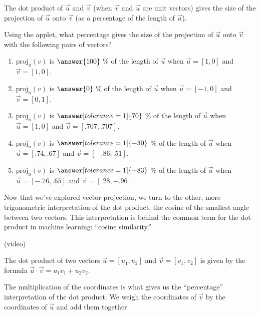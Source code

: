 \documentclass{ximera}
\begin{document}
\begin{problem}
The dot product of $\vec{u}$ and $\vec{v}$ (when $\vec{v}$  and $\vec{u}$ are unit vectors) gives the size of the projection of $\vec{u}$ onto $\vec{v}$ (as a percentage of the length of $\vec{u}$).

Using the applet, what percentage gives the size of the projection of $\vec{u}$ onto $\vec{v}$ with the following pairs of vectors?

\begin{enumerate}
\item $\text{proj}_u(v)$ is $\answer{100}$ $\%$ of the length of $\vec{u}$ when $\vec{u}=[1,0]$ and $\vec{v}=[1,0]$.
\item $\text{proj}_u(v)$ is $\answer{0}$ $\%$ of the length of $\vec{u}$ when $\vec{u}=[-1,0]$ and $\vec{v}=[0,1]$.
\item $\text{proj}_u(v)$ is $\answer[tolerance=1]{70}$ $\%$ of the length of $\vec{u}$ when $\vec{u}=[1,0]$ and $\vec{v}=[.707,.707]$.
\item $\text{proj}_u(v)$ is $\answer[tolerance=1]{-30}$ $\%$ of the length of $\vec{u}$ when $\vec{u}=[.74,.67]$ and $\vec{v}=[-.86,.51]$.
\item $\text{proj}_u(v)$ is $\answer[tolerance=1]{-83}$ $\%$ of the length of $\vec{u}$ when $\vec{u}=[-.76,.65]$ and $\vec{v}=[.28,-.96]$.
\end{enumerate}
\end{problem}

Now that we've explored vector projection, we turn to the other, more trigonometric interpretation of the dot product, the cosine of the smallest angle between two vectors. This interpretation is behind the common term for the dot product in machine learning: ``cosine similarity.''

(video)

\begin{definition}
The dot product of two vectors $\vec{u}=[u_1,u_2]$ and $\vec{v}=[v_1,v_2]$ is given by the formula $\vec{u}\cdot\vec{v}=u_1v_1+u_2v_2$.
\end{definition}

\begin{remark}
    The multiplication of the coordinates is what gives us the ``percentage'' interpretation of the dot product. We weigh the coordinates of $\vec{v}$ by the coordinates of $\vec{u}$ and add them together.
\end{remark}
\end{document}
